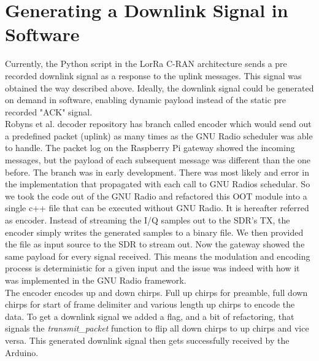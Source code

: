 \section{Generating a Downlink Signal in Software}
Currently, the Python script in the LorRa C-RAN architecture sends a pre recorded downlink signal as a response to the uplink messages.
This signal was obtained the way described above. Ideally, the downlink signal could be generated on demand in software, enabling dynamic 
payload instead of the static pre recorded "ACK" signal.\\
Robyns et al. decoder repository has branch called encoder which would send out a predefined packet (uplink) as many times as the GNU Radio scheduler 
was able to handle. The packet log on the Raspberry Pi gateway showed the incoming messages, but the payload of each subsequent message was different 
than the one before. The branch was in early development. There was most likely and error in the implementation that propagated with each call to GNU Radios schedular.
So we took the code out of the GNU Radio and refactored this OOT module into a single c++ file that can be executed without GNU Radio. It is hereafter referred as encoder.
Instead of streaming the I/Q samples out to the SDR's TX, the encoder simply writes the generated samples to a binary file.
We then provided the file as input source to the SDR to stream out. Now the gateway showed the same payload for every signal received. 
This means the modulation and encoding process is deterministic for a given input and the issue was indeed with how it was implemented in the GNU Radio framework.
\\
The encoder encodes up and down chirps. Full up chirps for preamble, full down chirps for start of frame delimiter and various length up chirps to encode the data.
To get a downlink signal we added a flag, and a bit of refactoring, that signals the \emph{transmit\_packet} function to flip all down chirps to up chirps and vice versa.
This generated downlink signal then gets successfully received by the Arduino. 

